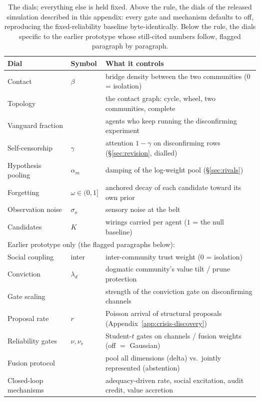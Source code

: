 \documentclass[runningheads]{llncs}
\begin{document}
\begin{table}[h!]
\centering\footnotesize
\begin{tabular}{lll}
\hline
Dial & Symbol & What it controls \\
\hline
Contact & $\beta$ & bridge density between the two communities (0 = isolation) \\
Topology & & the contact graph: cycle, wheel, two communities, complete \\
Vanguard fraction & & agents who keep running the disconfirming experiment \\
Self-censorship & $\gamma$ & attention $1-\gamma$ on disconfirming rows (\S\ref{sec:revision},
dialled) \\
Hypothesis pooling & $\alpha_m$ & damping of the log-weight pool (\S\ref{sec:rivals}) \\
Forgetting & $\omega\in(0,1]$ & anchored decay of each candidate toward its own prior \\
Observation noise & $\sigma_o$ & sensory noise at the belt \\
Candidates & $K$ & wirings carried per agent ($1$ = the null baseline) \\
\hline
\multicolumn{3}{l}{Earlier prototype only (the flagged paragraphs below):}\\
Social coupling & inter & inter-community trust weight (0 = isolation) \\
Conviction & $\lambda_d$ & dogmatic community's value tilt / prune protection \\
Gate scaling & & strength of the conviction gate on disconfirming channels \\
Proposal rate & $r$ & Poisson arrival of structural proposals
(Appendix~\ref{app:crisis-discovery}) \\
Reliability gates & $\nu,\nu_s$ & Student-$t$ gates on channels / fusion weights (off $=$
Gaussian) \\
Fusion protocol & & pool all dimensions (delta) vs.\ jointly represented (abstention) \\
Closed-loop mechanisms & & adequacy-driven rate, social excitation, audit credit, value
accretion \\
\hline
\end{tabular}
\caption{The dials; everything else is held fixed. Above the rule, the dials of the released
simulation described in this appendix: every gate and mechanism defaults to off,
reproducing the fixed-reliability baseline byte-identically. Below the rule, the dials
specific to the earlier prototype whose still-cited numbers follow, flagged paragraph by
paragraph.}
\label{tab:dials}
\end{table}
\end{document}

